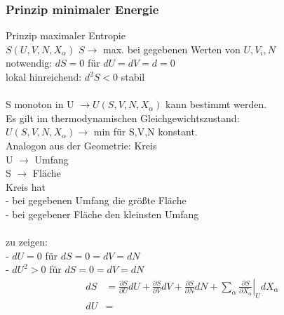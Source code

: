 \documentclass[10pt]{scrartcl}
\begin{document}
\begin{fleqn}
\subsubsection{Prinzip minimaler Energie}
Prinzip maximaler Entropie\\
$S(U,V,N,X_\alpha)$ $S\rightarrow$ max. bei gegebenen Werten von $U,V_i,N$\\
notwendig: $dS=0$ für $dU=dV=d=0$\\
lokal hinreichend: $d^2S<0$ stabil\\ \\
S monoton in U $\rightarrow U(S,V,N,X_\alpha)$ kann bestimmt werden.\\
Es gilt im thermodynamischen Gleichgewichtszustand:\\
$U(S,V,N,X_\alpha) \rightarrow$ min für S,V,N konstant.\\
Analogon aus der Geometrie: Kreis\\
U $\rightarrow$ Umfang\\
S $\rightarrow$ Fläche\\
Kreis hat\\
- bei gegebenen Umfang die größte Fläche\\
- bei gegebener Fläche den kleinsten Umfang\\ \\
zu zeigen:\\
- $dU=0$ für $dS=0=dV=dN$\\
- $dU^2 > 0$ für $dS=0=dV=dN$
\begin{equation}
\begin{aligned}
dS&=\frac{\partial S}{\partial U}dU+\frac{\partial S}{\partial V}dV+\frac{\partial S}{\partial N}dN+\left.\sum_\alpha\frac{\partial S}{\partial X_\alpha}\right|_UdX_\alpha\\
dU&=
\end{aligned}
\end{equation}
\end{fleqn}
\end{document}
